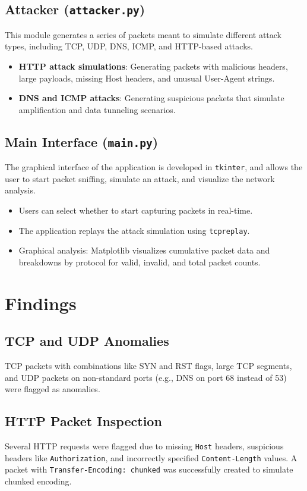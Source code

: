 \documentclass{article}
\begin{document}
\subsection{Attacker (\texttt{attacker.py})}
This module generates a series of packets meant to simulate different attack types, including TCP, UDP, DNS, ICMP, and HTTP-based attacks.
\begin{itemize}
    \item \textbf{HTTP attack simulations}: Generating packets with malicious headers, large payloads, missing Host headers, and unusual User-Agent strings.
    \item \textbf{DNS and ICMP attacks}: Generating suspicious packets that simulate amplification and data tunneling scenarios.
\end{itemize}

\subsection{Main Interface (\texttt{main.py})}
The graphical interface of the application is developed in \texttt{tkinter}, and allows the user to start packet sniffing, simulate an attack, and visualize the network analysis.
\begin{itemize}
    \item Users can select whether to start capturing packets in real-time.
    \item The application replays the attack simulation using \texttt{tcpreplay}.
    \item Graphical analysis: Matplotlib visualizes cumulative packet data and breakdowns by protocol for valid, invalid, and total packet counts.
\end{itemize}

\section{Findings}

\subsection{TCP and UDP Anomalies}
TCP packets with combinations like SYN and RST flags, large TCP segments, and UDP packets on non-standard ports (e.g., DNS on port 68 instead of 53) were flagged as anomalies.

\subsection{HTTP Packet Inspection}
Several HTTP requests were flagged due to missing \texttt{Host} headers, suspicious headers like \texttt{Authorization}, and incorrectly specified \texttt{Content-Length} values. A packet with \texttt{Transfer-Encoding: chunked} was successfully created to simulate chunked encoding.
\end{document}

